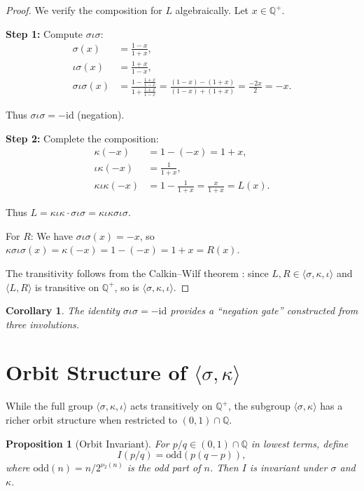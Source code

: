 \documentclass[11pt]{article}
\theoremstyle{plain}
\newtheorem{corollary}[theorem]{Corollary}
\newtheorem{proposition}[theorem]{Proposition}
\theoremstyle{definition}
\theoremstyle{remark}
\begin{document}
\begin{proof}
We verify the composition for $L$ algebraically. Let $x \in \mathbb{Q}^+$.

\textbf{Step 1:} Compute $\sigma\iota\sigma$:
\begin{align*}
\sigma(x) &= \frac{1-x}{1+x}, \\
\iota\sigma(x) &= \frac{1+x}{1-x}, \\
\sigma\iota\sigma(x) &= \frac{1 - \frac{1+x}{1-x}}{1 + \frac{1+x}{1-x}}
= \frac{(1-x)-(1+x)}{(1-x)+(1+x)} = \frac{-2x}{2} = -x.
\end{align*}

Thus $\sigma\iota\sigma = -\mathrm{id}$ (negation).

\textbf{Step 2:} Complete the composition:
\begin{align*}
\kappa(-x) &= 1 - (-x) = 1 + x, \\
\iota\kappa(-x) &= \frac{1}{1+x}, \\
\kappa\iota\kappa(-x) &= 1 - \frac{1}{1+x} = \frac{x}{1+x} = L(x).
\end{align*}

Thus $L = \kappa\iota\kappa \cdot \sigma\iota\sigma = \kappa\iota\kappa\sigma\iota\sigma$.

For $R$: We have $\sigma\iota\sigma(x) = -x$, so
$\kappa\sigma\iota\sigma(x) = \kappa(-x) = 1-(-x) = 1+x = R(x)$.

The transitivity follows from the Calkin--Wilf theorem \cite{CalkinWilf2000}:
since $L, R \in \langle \sigma, \kappa, \iota \rangle$ and $\langle L, R \rangle$
is transitive on $\mathbb{Q}^+$, so is $\langle \sigma, \kappa, \iota \rangle$.
\end{proof}

\begin{corollary}
The identity $\sigma\iota\sigma = -\mathrm{id}$ provides a ``negation gate''
constructed from three involutions.
\end{corollary}

\section{Orbit Structure of $\langle \sigma, \kappa \rangle$}

While the full group $\langle \sigma, \kappa, \iota \rangle$ acts transitively
on $\mathbb{Q}^+$, the subgroup $\langle \sigma, \kappa \rangle$ has a richer
orbit structure when restricted to $(0,1) \cap \mathbb{Q}$.

\begin{proposition}[Orbit Invariant]\label{prop:invariant}
For $p/q \in (0,1) \cap \mathbb{Q}$ in lowest terms, define
\[
I(p/q) = \mathrm{odd}(p(q-p)),
\]
where $\mathrm{odd}(n) = n / 2^{\nu_2(n)}$ is the odd part of $n$.
Then $I$ is invariant under $\sigma$ and $\kappa$.
\end{proposition}
\end{document}
